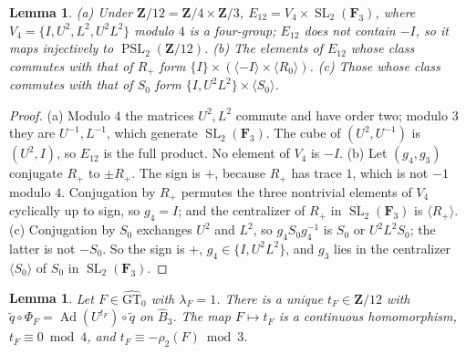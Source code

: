 \documentclass[11pt,a4paper]{article}
\theoremstyle{plain}
\newtheorem{lemma}[theorem]{Lemma}
\theoremstyle{definition}
\theoremstyle{remark}
\newcommand{\GTz}{\widehat{\mathrm{GT}}_0}
\newcommand{\Z}{\mathbf Z}
\newcommand{\F}{\mathbf F}
\newcommand{\Bh}{\widehat B}
\newcommand{\Ad}{\operatorname{Ad}}
\newcommand{\SL}{\operatorname{SL}}
\newcommand{\PSL}{\operatorname{PSL}}
\begin{document}
\begin{lemma}\label{lem:E}
\textup{(a)} Under $\Z/12=\Z/4\times\Z/3$, $E_{12}=V_4\times\SL_2(\F_3)$, where $V_4=\{I,U^2,L^2,U^2L^2\}$ modulo
$4$ is a four-group; $E_{12}$ does not contain $-I$, so it maps injectively to $\PSL_2(\Z/12)$.
\textup{(b)} The elements of $E_{12}$ whose class commutes with that of $R_+$ form
$\{I\}\times(\langle-I\rangle\times\langle R_0\rangle)$.
\textup{(c)} Those whose class commutes with that of $S_0$ form $\{I,U^2L^2\}\times\langle S_0\rangle$.
\end{lemma}

\begin{proof}
(a) Modulo $4$ the matrices $U^2,L^2$ commute and have order two; modulo $3$ they are $U^{-1},L^{-1}$, which
generate $\SL_2(\F_3)$. The cube of $(U^2,U^{-1})$ is $(U^2,I)$, so $E_{12}$ is the full product. No element of
$V_4$ is $-I$. (b) Let $(g_4,g_3)$ conjugate $R_+$ to $\pm R_+$. The sign is $+$, because $R_+$ has trace $1$,
which is not $-1$ modulo $4$. Conjugation by $R_+$ permutes the three nontrivial elements of $V_4$ cyclically up
to sign, so $g_4=I$; and the centralizer of $R_+$ in $\SL_2(\F_3)$ is $\langle R_+\rangle$. (c) Conjugation by
$S_0$ exchanges $U^2$ and $L^2$, so $g_4S_0g_4^{-1}$ is $S_0$ or $U^2L^2S_0$; the latter is not $-S_0$. So the
sign is $+$, $g_4\in\{I,U^2L^2\}$, and $g_3$ lies in the centralizer $\langle S_0\rangle$ of $S_0$ in
$\SL_2(\F_3)$.
\end{proof}

\begin{lemma}\label{lem:shear}
Let $F\in\GTz$ with $\lambda_F=1$. There is a unique $t_F\in\Z/12$ with
$\tilde q\circ\Phi_F=\Ad(U^{t_F})\circ\tilde q$ on $\Bh_3$. The map $F\mapsto t_F$ is a continuous homomorphism,
$t_F\equiv0\bmod4$, and $t_F\equiv-\rho_2(F)\bmod3$.
\end{lemma}
\end{document}
